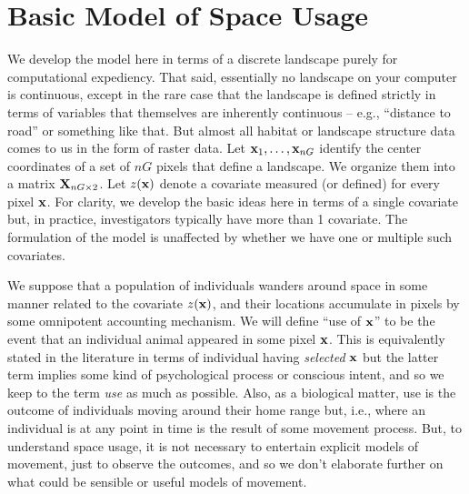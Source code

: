 \section{Basic Model of Space Usage}
\label{rsf.sec.rsfmodel}

We develop the model here in terms of a discrete landscape purely for
computational expediency. That said, essentially no landscape on your
computer is continuous, except in the rare case that the landscape is
defined strictly in terms of variables that themselves are inherently
continuous -- e.g., ``distance to road'' or something like that.  But
almost all habitat or landscape structure data comes to us in the form
of raster data.  Let ${\bf x}_{1},\ldots,{\bf x}_{nG}$ identify the center
coordinates of a set of $nG$ pixels that define a landscape.
We organize them into a matrix
${\bf X}_{nG \times 2}$.  Let $z({\bf x})$ denote a covariate measured
(or defined) for
every pixel ${\bf x}$. For clarity, we develop the basic ideas here in terms of a
single covariate but, in practice, investigators typically have more
than 1 covariate. The formulation of the model is unaffected by
whether we have one or multiple such covariates. 

We suppose that a population of individuals wanders around space in
some manner related to the covariate $z({\bf x})$, and their locations
accumulate in pixels by some omnipotent accounting mechanism. We will
define ``use of ${\bf x}$'' to be the event that an individual animal
appeared in some pixel ${\bf x}$. This is equivalently stated in the
literature in terms of individual having {\it selected} ${\bf x}$ but
the latter term implies some kind of psychological process or
conscious intent, and so we keep to the term {\it use} as much as
possible.  Also, as a biological matter, use is the outcome of
individuals moving around their home range but, i.e., where an
individual is at any point in time is the result of some movement
process. But, to understand space usage, it is not necessary to
entertain explicit models of movement, just to observe the outcomes,
and so we don't elaborate further on what could be sensible or useful
models of movement.

